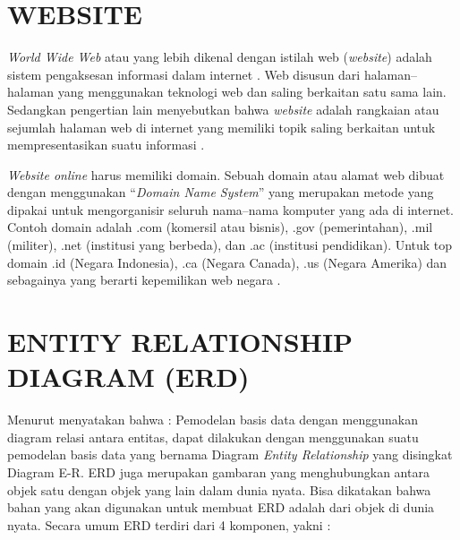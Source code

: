 \section{\uppercase{Website}}
\textit{World Wide Web} atau yang lebih dikenal dengan istilah web (\textit{website}) adalah sistem pengaksesan informasi dalam internet \citep{abdul2014pengenalan}. Web disusun dari halaman–halaman yang menggunakan teknologi web dan saling berkaitan satu sama lain. Sedangkan pengertian lain menyebutkan bahwa \textit{website} adalah rangkaian atau sejumlah halaman web di internet yang memiliki topik saling berkaitan untuk mempresentasikan suatu informasi \citep{ginanjar2014rahasia}.

\par \textit{Website online} harus memiliki domain. Sebuah domain atau alamat web dibuat dengan menggunakan “\textit{Domain Name System}” yang merupakan metode yang dipakai untuk mengorganisir seluruh nama–nama komputer yang ada di internet. Contoh domain adalah .com (komersil atau bisnis), .gov (pemerintahan), .mil (militer), .net (institusi yang berbeda), dan .ac (institusi pendidikan). Untuk top domain .id (Negara Indonesia), .ca (Negara Canada), .us (Negara Amerika) dan sebagainya yang berarti kepemilikan web negara \citep{dhika2015perancangan}.

\section{\uppercase{Entity Relationship Diagram (ERD)}}
Menurut \citep{priyadi2014} menyatakan bahwa : Pemodelan basis data dengan menggunakan diagram relasi antara entitas, dapat dilakukan dengan menggunakan suatu pemodelan basis data yang bernama Diagram \textit{Entity Relationship} yang disingkat Diagram E-R. ERD juga merupakan gambaran yang menghubungkan antara objek satu dengan objek yang lain dalam dunia nyata. Bisa dikatakan bahwa bahan yang akan digunakan untuk membuat ERD adalah dari objek di dunia nyata. Secara umum ERD terdiri dari 4 komponen, yakni :


